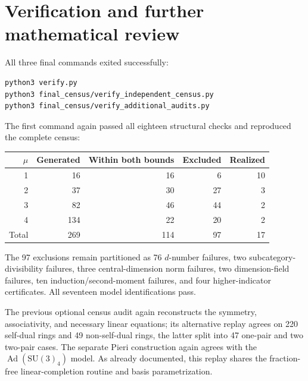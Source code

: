 \documentclass[11pt,a4paper]{article}
\begin{document}
\section{Verification and further mathematical review}

All three final commands exited successfully:
\begin{verbatim}
python3 verify.py
python3 final_census/verify_independent_census.py
python3 final_census/verify_additional_audits.py
\end{verbatim}
The first command again passed all eighteen structural checks and
reproduced the complete census:
\begin{center}
\begin{tabular}{rrrrr}
\toprule
$\mu$&Generated&Within both bounds&Excluded&Realized\\\midrule
1&16&16&6&10\\
2&37&30&27&3\\
3&82&46&44&2\\
4&134&22&20&2\\\midrule
Total&269&114&97&17\\\bottomrule
\end{tabular}
\end{center}
The 97 exclusions remain partitioned as 76 $d$-number failures,
two subcategory-divisibility failures, three central-dimension norm
failures, two dimension-field failures, ten induction/second-moment
failures, and four higher-indicator certificates. All seventeen model
identifications pass.

The previous optional census audit again reconstructs the symmetry,
associativity, and necessary linear equations; its alternative replay
agrees on 220 self-dual rings and 49 non-self-dual rings, the latter
split into 47 one-pair and two two-pair cases. The separate Pieri
construction again agrees with the $\operatorname{Ad}(\mathrm{SU}(3)_4)$
model. As already documented, this replay shares the fraction-free
linear-completion routine and basis parametrization.
\end{document}
